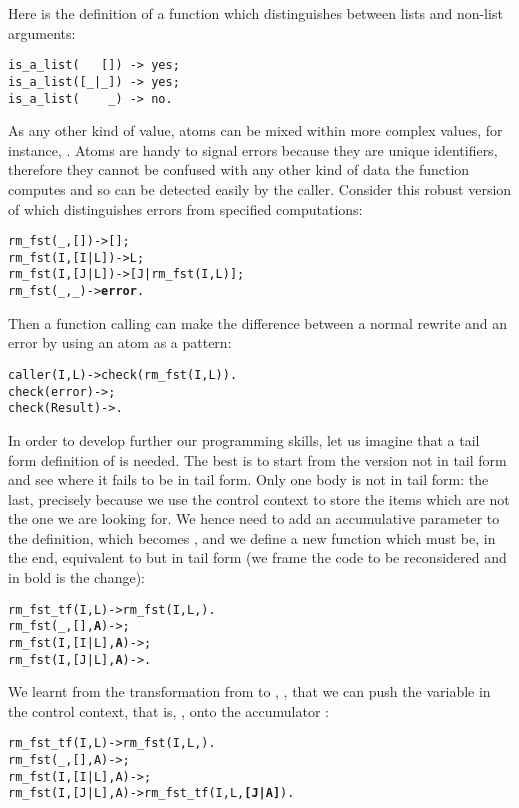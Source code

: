 Here is the definition of a function which distinguishes between lists
and non\hyp{}list arguments:\label{code:is_a_list}
\begin{verbatim}
is_a_list(   []) -> yes;
is_a_list([_|_]) -> yes;
is_a_list(    _) -> no.
\end{verbatim}
As any other kind of value, atoms can be mixed within more complex
values, for instance, . Atoms are handy to
signal errors because they are unique identifiers, therefore they
cannot be confused with any other kind of data the function computes
and so can be detected easily by the caller. Consider this robust
version of  which distinguishes errors from
specified computations:
\begin{alltt}
rm_fst(_,   []) -> [];
rm_fst(I,[I|L]) -> L;
rm_fst(I,[J|L]) -> [J|rm_fst(I,L)];
rm_fst(_,    _) -> \textbf{error}.\hfill% \emph{An atom}
\end{alltt}
Then a function calling  can make the difference
between a normal rewrite and an error by using an atom as a pattern:
\begin{alltt}
caller(I,L)   -> check(rm_fst(I,L)).
check(error)  -> \fbcode{[........]};\hfill% \emph{Atom as a pattern}
check(Result) -> \fbcode{[........]}.
\end{alltt}
In order to develop further our programming skills, let us imagine
that a tail form definition of  is needed. The best
is to start from the version not in tail form and see where it fails
to be in tail form. Only one body is not in tail form: the last,
precisely because we use the control context to store the items which
are not the one we are looking for. We hence need to add an
accumulative parameter  to the definition, which becomes
, and we define a new function
 which must be, in the end, equivalent to
 but in tail form (we frame the code to be
reconsidered and in bold is the change):
\begin{alltt}
rm_fst_tf(I,L)    -> rm_fst(I,L,\fbcode{[]}).
rm_fst(_,   [],\textbf{A}) -> \fbox{[]};
rm_fst(I,[I|L],\textbf{A}) -> ;
rm_fst(I,[J|L],\textbf{A}) -> .
\end{alltt}
We learnt from the transformation from  to
, , that
we can push the variable in the control context, that is, ,
onto the accumulator :
\begin{alltt}
rm_fst_tf(I,L)    -> rm_fst(I,L,\fbcode{[]}).
rm_fst(_,   [],A) -> \fbox{[]};
rm_fst(I,[I|L],A) -> ;
rm_fst(I,[J|L],A) -> rm_fst_tf(I,L,\textbf{[J|A]}).
\end{alltt}
